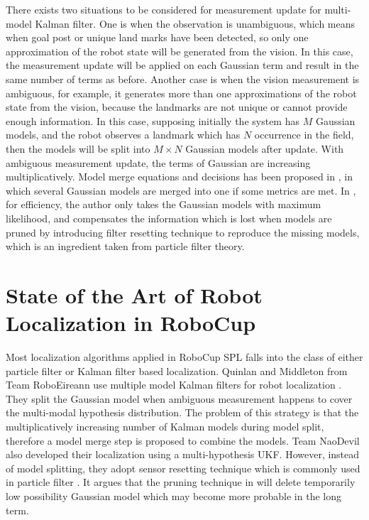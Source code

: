 There exists two situations to be considered for measurement update for multi-model Kalman filter. One is when the observation is unambiguous, which means when goal post or unique land marks have been detected, so only one approximation of the robot state will be generated from the vision. In this case, the measurement update will be applied on each Gaussian term and result in the same number of terms as before. Another case is when the vision measurement is ambiguous, for example, it generates more than one approximations of the robot state from the vision, because the landmarks are not unique or cannot provide enough information. In this case, supposing initially the system has $M$ Gaussian models, and the robot observes a landmark which has $N$ occurrence in the field, then the models will be split into $M \times N$ Gaussian models after update. With ambiguous measurement update, the terms of Gaussian are increasing multiplicatively. Model merge equations and decisions has been proposed in \cite{Quinlan2010}, in which several Gaussian models are merged into one if some metrics are met. In \cite{Jochmann2012}, for efficiency, the author only takes the Gaussian models with maximum likelihood, and compensates the information which is lost when models are pruned by introducing filter resetting technique to reproduce the missing models, which is an ingredient taken from particle filter theory.

\section{State of the Art of Robot Localization in RoboCup}\label{sec:2.2}
Most localization algorithms applied in RoboCup \gls{SPL} falls into the class of either particle filter or Kalman filter based localization. Quinlan and Middleton from Team RoboEireann use multiple model Kalman filters for robot localization \cite{Quinlan2010}. They split the Gaussian model when ambiguous measurement happens to cover the multi-modal hypothesis distribution. The problem of this strategy is that the multiplicatively increasing number of Kalman models during model split, therefore a model merge step is proposed to combine the models. Team NaoDevil also developed their localization using a multi-hypothesis \gls{UKF}. However, instead of model splitting, they adopt sensor resetting technique which is commonly used in particle filter \cite{Jochmann2012}. It argues that the  pruning technique in \cite{Quinlan2010} will delete temporarily low possibility Gaussian model which may become more probable in the long term.

